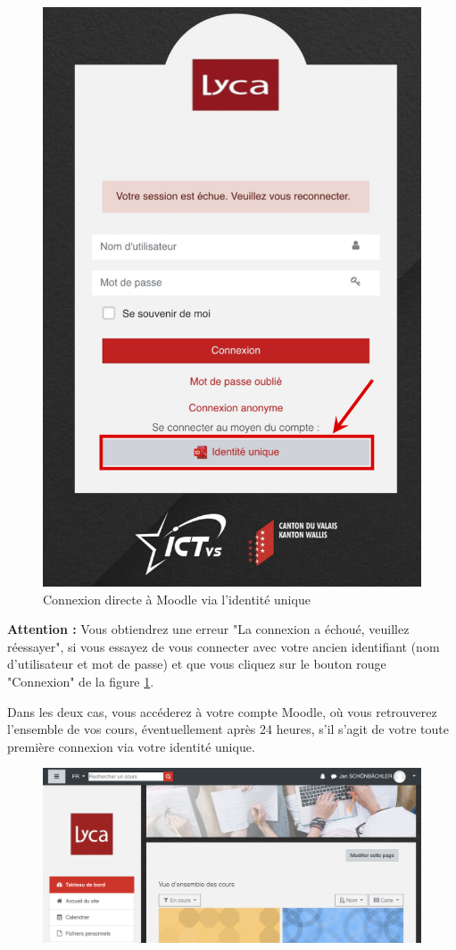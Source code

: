 \documentclass[10pt,a4paper]{report}
\begin{document}
	
	\begin{figure}[H]
		\centering
		\includegraphics[width=0.48\linewidth]{images/connexion_moodle_21}
		\caption{Connexion directe à Moodle via l'identité unique}
		\label{fig:connexionMoodle21}
	\end{figure}
	
	
	\textbf{Attention :} Vous obtiendrez une erreur "La connexion a échoué, veuillez réessayer", si vous essayez de vous connecter avec votre ancien identifiant (nom d'utilisateur et mot de passe) et que vous cliquez sur le bouton rouge "Connexion" de la figure \ref{fig:connexionMoodle21}.
	
	
	Dans les deux cas, vous accéderez à votre compte Moodle, où vous retrouverez l'ensemble de vos cours, éventuellement après 24 heures, s'il s'agit de votre toute première connexion via votre identité unique.
	
	\begin{figure}[H]
		\centering
		\includegraphics[width=.75\linewidth]{images/capture_moodle_lyca_2021}
		\caption{}
		\label{fig:capturemoodlelyca}
	\end{figure}
	
\end{document}
